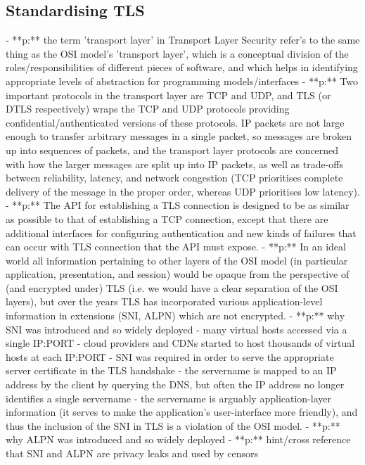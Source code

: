 \subsection{Standardising TLS}
      - **p:** the term 'transport layer' in Transport Layer Security refer's to the same thing as the OSI model's 'transport layer', which is a conceptual division of the roles/responsibilities of different pieces of software, and which helps in identifying appropriate levels of abstraction for programming models/interfaces
      - **p:** Two important protocols in the transport layer are TCP and UDP, and TLS (or DTLS respectively) wraps the TCP and UDP protocols providing confidential/authenticated versions of these protocols. IP packets are not large enough to transfer arbitrary messages in a single packet, so messages are broken up into sequences of packets, and the transport layer protocols are concerned with how the larger messages are split up into IP packets, as well as trade-offs between reliability, latency, and network congestion (TCP prioritises complete delivery of the message in the proper order, whereas UDP prioritises low latency).
      - **p:** The API for establishing a TLS connection is designed to be as similar as possible to that of establishing a TCP connection, except that there are additional interfaces for configuring authentication and new kinds of failures that can occur with TLS connection that the API must expose.
      - **p:** In an ideal world all information pertaining to other layers of the OSI model (in particular application, presentation, and session) would be opaque from the perspective of (and encrypted under) TLS (i.e. we would have a clear separation of the OSI layers), but over the years TLS has incorporated various application-level information in extensions (SNI, ALPN) which are not encrypted.
      - **p:** why SNI was introduced and so widely deployed
          - many virtual hosts accessed via a single IP:PORT
          - cloud providers and CDNs started to host thousands of virtual hosts at each IP:PORT
          - SNI was required in order to serve the appropriate server certificate in the TLS handshake
          - the servername is mapped to an IP address by the client by querying the DNS, but often the IP address no longer identifies a single servername
          - the servername is arguably application-layer information (it serves to make the application's user-interface more friendly), and thus the inclusion of the SNI in TLS is a violation of the OSI model. 
      - **p:** why ALPN was introduced and so widely deployed
      - **p:** hint/cross reference that SNI and ALPN are privacy leaks and used by censors
